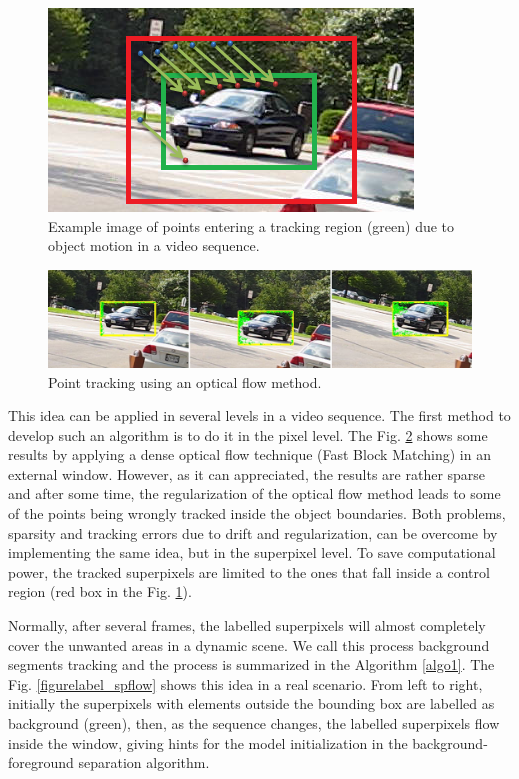    \begin{figure}[thpb]
      \centering
      \includegraphics[height=0.285\textheight]{../images/tracking_points.png}
      \caption{Example image of points entering a tracking region (green) due to object motion in a video sequence.}
      \label{figurelabel_entering}
   \end{figure}
\setlength{\belowcaptionskip}{-10pt}

   \begin{figure}[thpb]
      \centering
      \includegraphics[width=1\textwidth]{../images/pointTr.png}
      \caption{Point tracking using an optical flow method.}
      \label{pointtr}
   \end{figure}


This idea can be applied in several levels in a video sequence. The first method to develop such an algorithm is to do it in the pixel level. The Fig. \ref{pointtr} shows some results by applying 
a dense optical flow technique (Fast Block Matching) in an external window. However, as it can appreciated, the results are rather sparse and after some time, the regularization of the 
optical flow method leads to some of the points being wrongly tracked inside the object boundaries. Both problems, sparsity and tracking errors due to drift and regularization, can be 
overcome by implementing the same idea, but in the superpixel level.
To save computational power, the tracked superpixels are 
limited to the ones that fall inside a control region (red box in the Fig.  \ref{figurelabel_entering}). 

Normally, after several frames, 
the labelled superpixels will almost completely cover the unwanted areas in a dynamic scene. We call this process background segments tracking and the process is summarized in the 
Algorithm \ref{algo1}.  The Fig. \ref{figurelabel_spflow} shows this idea in a real scenario. From left to right, initially the superpixels with 
elements outside the bounding box are labelled as background (green), then, as the sequence changes, the labelled superpixels flow inside the window, giving hints for the model initialization in the background-foreground separation algorithm.


